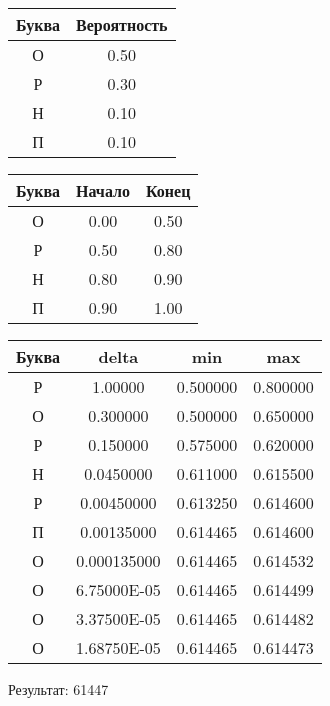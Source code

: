 \documentclass[a4paper, 12pt]{article}
\begin{document}
\begin{center}
 \begin{tabular}{ |c|c| } 
  \hline
     Буква & Вероятность \\ \hline
О & 0.50\\\hline
Р & 0.30\\\hline
Н & 0.10\\\hline
П & 0.10
\\ \hline \end{tabular}
\end{center}
\begin{center}
 \begin{tabular}{ |c|c|c| } 
  \hline
     Буква & Начало & Конец \\ \hline
О & 0.00 & 0.50\\\hline
Р & 0.50 & 0.80\\\hline
Н & 0.80 & 0.90\\\hline
П & 0.90 & 1.00
\\ \hline \end{tabular}
\end{center}
\begin{center}
 \begin{tabular}{ |c|c|c|c| } 
  \hline
     Буква & delta & min & max \\ \hline
Р & 1.00000 & 0.500000 & 0.800000\\\hline
О & 0.300000 & 0.500000 & 0.650000\\\hline
Р & 0.150000 & 0.575000 & 0.620000\\\hline
Н & 0.0450000 & 0.611000 & 0.615500\\\hline
Р & 0.00450000 & 0.613250 & 0.614600\\\hline
П & 0.00135000 & 0.614465 & 0.614600\\\hline
О & 0.000135000 & 0.614465 & 0.614532\\\hline
О & 6.75000E-05 & 0.614465 & 0.614499\\\hline
О & 3.37500E-05 & 0.614465 & 0.614482\\\hline
О & 1.68750E-05 & 0.614465 & 0.614473
\\ \hline \end{tabular}
\end{center}
Результат: 61447
\end{document}
